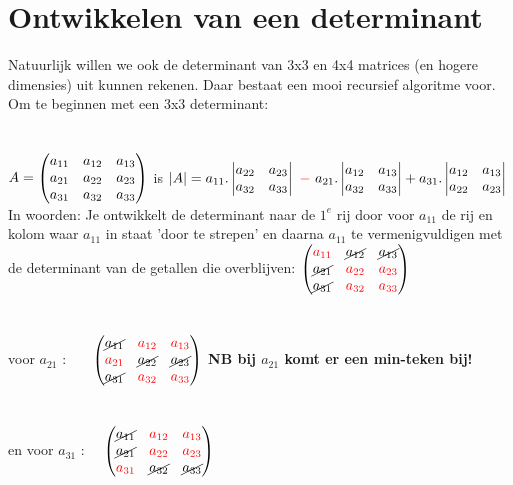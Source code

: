 \documentclass[hidelinks, a4wide, 12pt,  twoside]{book}
\begin{document}
\section{Ontwikkelen van een determinant}
Natuurlijk willen we ook de determinant van 3x3 en 4x4 matrices (en hogere dimensies) uit kunnen rekenen. Daar bestaat een mooi recursief algoritme voor. Om te beginnen met een 3x3 determinant:\\ \\ \\
{ $  A  = \begin{pmatrix}  a_{11} & a_{12} & a_{13}  \\  a_{21} & a_{22} & a_{23}  \\  a_{31} & a_{32}& a_{33}  \end{pmatrix}  $
	\quad is   \quad 
	$ |A|  = a_{11} .   \begin{vmatrix} a_{22} & a_{23} \\ a_{32}& a_{33}  \end{vmatrix} 
	\  {\color{red}-} \ a_{21} .   \begin{vmatrix} a_{12} & a_{13} \\ a_{32}& a_{33}  \end{vmatrix} 
	+a_{31} .   \begin{vmatrix} a_{12} & a_{13} \\  a_{22} & a_{23}  \end{vmatrix}  $ } \\
In woorden: Je ontwikkelt de determinant naar de $ 1^{e} $ rij door voor $  a_{11} $ de rij en kolom waar $  a_{11} $ in staat 'door te strepen' en daarna $  a_{11}  $ te vermenigvuldigen met de determinant van de getallen die overblijven:
$  \begin{pmatrix}   {\color{red}a_{11}} & \cancel{a_{12}} & \cancel{a_{13} }  \\  \cancel{a_{21}} & {\color{red}a_{22}} & {\color{red}a_{23}}  \\  \cancel{a_{31}} & {\color{red}a_{32}} & {\color{red}a_{33}}  \end{pmatrix}  $ \\ \\ \\
voor  $  a_{21}  $ :
\qquad \qquad \quad \ \ \ $  \begin{pmatrix}  \cancel{ a_{11}} & {\color{red}a_{12}} & {\color{red}a_{13 }}  \\ {\color{red}a_{21}} & \cancel{a_{22}} & \cancel{a_{23}}  \\  \cancel{a_{31}} & {\color{red}a_{32}}  & {\color{red}a_{33} } \end{pmatrix}   $
\quad \textbf{NB bij $  a_{21}  $ komt er een min-teken bij!}\\ \\ \\
en voor   $  a_{31} $  :
\qquad \qquad \  \ $   \begin{pmatrix}  \cancel{ a_{11}} & {\color{red}a_{12}} & {\color{red}a_{13}}   \\  \cancel{a_{21}} & {\color{red}a_{22}} & {\color{red}a_{23}}  \\  {\color{red}a_{31}} & \cancel{a_{32}} & \cancel{a_{33} }  \end{pmatrix}  $
\\ \\
\end{document}
